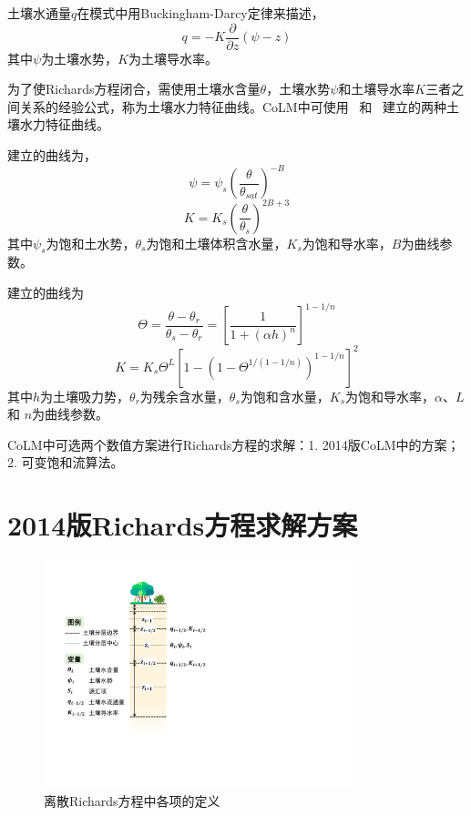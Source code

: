 土壤水通量$q$在模式中用Buckingham-Darcy定律来描述，
\begin{equation}
q=-K \frac{\partial}{\partial z}(\psi-z)
\end{equation}
其中$\psi$为土壤水势，$K$为土壤导水率。

为了使Richards方程闭合，需使用土壤水含量$\theta$，土壤水势$\psi$和土壤导水率$K$三者之间关系的经验公式，称为土壤水力特征曲线。CoLM中可使用~\citet{campbell1974} 和~\citet{van1980closed} 建立的两种土壤水力特征曲线。

\citet{campbell1974}建立的曲线为，
\begin{equation}\label{eq:SW_CB}
\psi=\psi_{s}\left(\frac{\theta}{\theta_{sat}}\right)^{-B}
\end{equation}
\begin{equation}\label{eq:Ks_CB}
K=K_{s}\left(\frac{\theta}{\theta_{s}}\right)^{2 B+3}
\end{equation}
其中$\psi_s$为饱和土水势，$\theta_{s}$为饱和土壤体积含水量，$K_{s}$为饱和导水率，$B$为曲线参数。

\citet{van1980closed} 建立的曲线为
\begin{equation}\label{eq:SW_VG}
    \Theta = \frac{\theta-\theta_r}{\theta_s-\theta_r} = \left[\frac{1}{1+\left(\alpha h\right)^n}\right]^{1-1/n}
\end{equation}
\begin{equation}\label{eq:Ks_VG}
    K = K_s \Theta^L \left[1-\left(1-\Theta^{1/\left(1-1/n\right)}\right)^{1-1/n}\right]^2
\end{equation}
其中$h$为土壤吸力势，$\theta_r$为残余含水量，$\theta_s$为饱和含水量，$K_{s}$为饱和导水率，$\alpha$、$L$ 和 $n$为曲线参数。

CoLM中可选两个数值方案进行Richards方程的求解：1. 2014版CoLM中的方案；2. 可变饱和流算法。

\section{2014版Richards方程求解方案}

{
\begin{figure}[htbp]
\centering
\includegraphics[width=0.8\textwidth]{Figures/植被冠层和土壤水分/土壤水离散.pdf}
\caption{离散Richards方程中各项的定义}
\label{fig:土壤水离散}
\end{figure}
}

